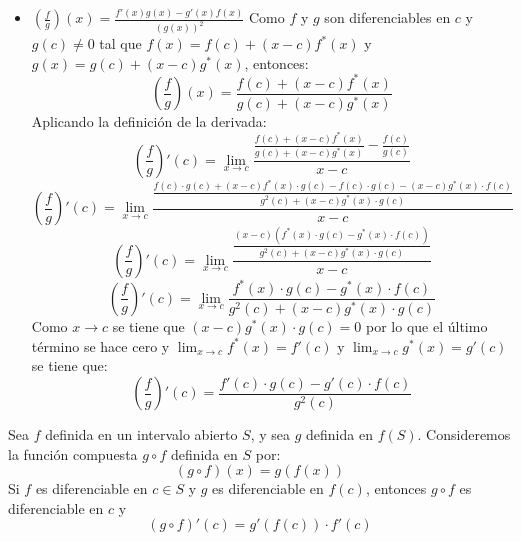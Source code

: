 \begin{prueba}
\begin{itemize}
\item $\left(\frac{f}{g}\right)(x) = \frac{f'(x)g(x) - g'(x)f(x)}{(g(x))^2}$
Como $f$ y $g$ son diferenciables en $c$ y $g(c) \neq 0$ tal que $f(x) = f(c) + (x-c)f^*(x)$ y $g(x) = g(c) + (x-c)g^*(x)$, entonces:
\[\left(\frac{f}{g}\right)(x) = \frac{f(c) + (x-c)f^*(x)}{g(c) + (x-c)g^*(x)}\]
Aplicando la definición de la derivada:
\[\left(\frac{f}{g}\right)'(c) = \lim_{x \to c} \frac{\frac{f(c) + (x-c)f^*(x)}{g(c) + (x-c)g^*(x)} - \frac{f(c)}{g(c)}}{x-c}\]
\[\left(\frac{f}{g}\right)'(c) = \lim_{x \to c} \frac{\frac{f(c) \cdot g(c) + (x-c)f^*(x) \cdot g(c) - f(c) \cdot g(c) - (x-c)g^*(x) \cdot f(c)}{g^2(c) + (x-c)g^*(x) \cdot g(c)}}{x-c}\]
\[\left(\frac{f}{g}\right)'(c) = \lim_{x \to c} \frac{\frac{(x-c)(f^*(x) \cdot g(c) - g^*(x) \cdot f(c))}{g^2(c) + (x-c)g^*(x) \cdot g(c)}}{x-c}\]
\[\left(\frac{f}{g}\right)'(c) = \lim_{x \to c} \frac{f^*(x) \cdot g(c) - g^*(x) \cdot f(c)}{g^2(c) + (x-c)g^*(x) \cdot g(c)}\]
Como $x \to c$ se tiene que $(x-c)g^*(x) \cdot g(c) = 0$ por lo que el último término se hace cero y $\lim_{x \to c} f^*(x) = f'(c)$ y $\lim_{x \to c} g^*(x) = g'(c)$ se tiene que:
\[\left(\frac{f}{g}\right)'(c) = \frac{f'(c) \cdot g(c) - g'(c) \cdot f(c)}{g^2(c)}\]


    \end{itemize}
\end{prueba}
\begin{teorema}
Sea $f$ definida en un intervalo abierto $S$, y sea $g$ definida en $f(S)$. Consideremos la función compuesta $g \circ f$ definida en $S$ por:
\[(g \circ f)(x) = g(f(x))\]
Si $f$ es diferenciable en $c \in S$ y $g$ es diferenciable en $f(c)$, entonces $g \circ f$ es diferenciable en $c$ y
\[(g \circ f)'(c) = g'(f(c)) \cdot f'(c)\]
\end{teorema}
